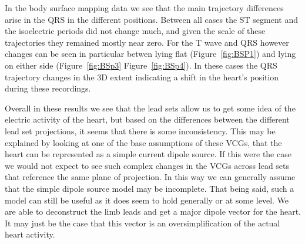 \documentclass[12pt]{article}
\begin{document}
\par{}
In the body surface mapping data we see that the main trajectory differences arise in the QRS in the different positions. Between all cases the ST segment and the isoelectric periods did not change much, and given the scale of these trajectories they remained mostly near zero. For the T wave and QRS however changes can be seen in particular betwen lying flat (Figure~\ref{fig:BSP1}) and lying on either side (Figure~\ref{fig:BSp3} Figure~\ref{fig:BSp4}). In these cases the QRS trajectory changes in the 3D extent indicating a shift in the heart's position during these recordings.

\par{}
Overall in these results we see that the lead sets allow us to get some idea of the electric activity of the heart, but based on the differences between the different lead set projections, it seems that there is some inconsistency. This may be explained by looking at one of the base assumptions of these VCGs, that the heart can be represented as a simple current dipole source. If this were the case we would not expect to see such complex changes in the VCGs across lead sets that reference the same plane of projection. In this way we can generally assume that the simple dipole source model may be incomplete. That being said, such a model can still be useful as it does seem to hold generally or at some level. We are able to deconstruct the limb leads and get a major dipole vector for the heart. It may just be the case that this vector is an oversimplification of the actual heart activity.



\end{document}
